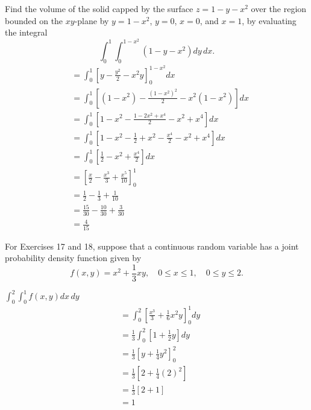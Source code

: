 \documentclass[12pt]{article}
\newenvironment{problem}[2][]{
    \begin{trivlist}
        \item[
            {\bfseries #1}
            {\bfseries #2.}
        ]
}{\end{trivlist}}
\begin{document}
\begin{problem}{15}
    Find the volume of the solid capped by the surface $z = 1 - y - x^2$ over the region bounded on the $xy$-plane by $y = 1 - x^2$, $y = 0$, $x = 0$, and $x = 1$, by evaluating the integral $$\int_0^1 \int_0^{1 - x^2} \left(1 - y - x^2\right) dy \, dx.$$
    \begin{align}
        &= \int_0^1 \left[y - \frac{y^2}{2} - x^2 y\right]_0^{1 - x^2} dx \\
        &= \int_0^1 \left[\left(1 - x^2\right) - \frac{\left(1 - x^2\right)^2}{2} - x^2 \left(1 - x^2\right)\right] dx \\
        &= \int_0^1 \left[1 - x^2 - \frac{1 - 2x^2 + x^4}{2} - x^2 + x^4\right] dx \\
        &= \int_0^1 \left[1 - x^2 - \frac{1}{2} + x^2 - \frac{x^4}{2} - x^2 + x^4\right] dx \\
        &= \int_0^1 \left[\frac{1}{2} - x^2 + \frac{x^4}{2}\right] dx \\
        &= \left[\frac{x}{2} - \frac{x^3}{3} + \frac{x^5}{10}\right]_0^1 \\
        &= \frac{1}{2} - \frac{1}{3} + \frac{1}{10} \\
        &= \frac{15}{30} - \frac{10}{30} + \frac{3}{30} \\
        &= \frac{4}{15}
        \end{align}
\end{problem}

\noindent For Exercises 17 and 18, suppose that a continuous random variable has a joint probability density function given by $$f(x,y) = x^2 + \frac{1}{3} xy, \quad
0 \leq x \leq 1, \quad 0 \leq y \leq 2.$$

\begin{problem}{17}
    $\displaystyle\int_0^2 \displaystyle\int_0^1 f\left(x,y\right) dx \, dy$
    \begin{align}
        &= \int_0^2 \left[\frac{x^3}{3} + \frac{1}{6} x^2 y\right]_0^1 dy \\
        &= \frac{1}{3} \int_0^2 \left[1 + \frac{1}{2} y\right] dy \\
        &= \frac{1}{3} \left[y + \frac{1}{4} y^2\right]_0^2 \\
        &= \frac{1}{3} \left[2 + \frac{1}{4} \left(2\right)^2\right] \\
        &= \frac{1}{3} \left[2 + 1\right] \\
        &= 1
    \end{align}
\end{problem}
\end{document}
